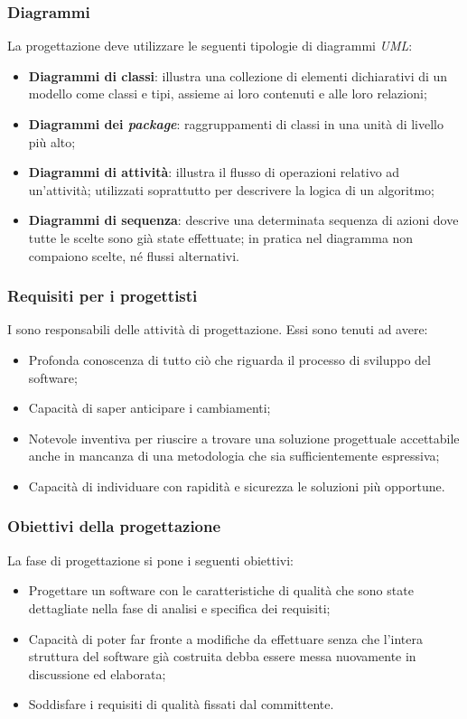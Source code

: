 \subsubsection{Diagrammi}
La progettazione deve utilizzare le seguenti tipologie di diagrammi \textit{UML}:
\begin{itemize} 
\item
\textbf{Diagrammi di classi}: illustra una collezione di elementi dichiarativi di un modello come classi e tipi, assieme ai loro contenuti e alle loro relazioni;  
\item
\textbf{Diagrammi dei \textit{package}}: raggruppamenti di classi in una unità di livello più alto;
\item
\textbf{Diagrammi di attività}: illustra il flusso di operazioni relativo ad un'attività; utilizzati soprattutto per descrivere la logica di un algoritmo;  
\item
\textbf{Diagrammi di sequenza}: descrive una determinata sequenza di azioni dove tutte le scelte sono già state effettuate; in pratica nel diagramma non compaiono scelte, né flussi alternativi.
\end{itemize}


\subsubsection{Requisiti per i progettisti}

I \textit{\Progs} sono responsabili delle attività di progettazione. Essi sono tenuti ad avere:
\begin{itemize} 
\item
Profonda conoscenza di tutto ciò che riguarda il processo di sviluppo del software;
\item
Capacità di saper anticipare i cambiamenti;
\item
Notevole inventiva per riuscire a trovare una soluzione progettuale accettabile anche in mancanza di una metodologia che sia sufficientemente espressiva;
\item
Capacità di individuare con rapidità e sicurezza le soluzioni più opportune.
\end{itemize}

\subsubsection{Obiettivi della progettazione}
La fase di progettazione si pone i seguenti obiettivi:
\begin{itemize} 
\item
Progettare un software con le caratteristiche di qualità che sono state dettagliate nella fase di analisi e specifica dei requisiti;
\item
Capacità di poter far fronte a modifiche da effettuare senza che l'intera struttura del software già costruita debba essere messa nuovamente in discussione ed elaborata;
\item
Soddisfare i requisiti di qualità fissati dal committente.
\end{itemize}

